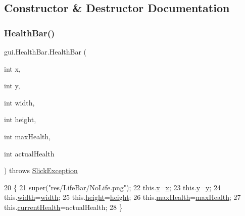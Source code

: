 \subsection{Constructor \& Destructor Documentation}
\mbox{\label{classgui_1_1_health_bar_a5f226ed0f456c4278c6c8eb0c927acc8}} 
\subsubsection{\texorpdfstring{Health\+Bar()}{HealthBar()}}
{\footnotesize\ttfamily gui.\+Health\+Bar.\+Health\+Bar (\begin{DoxyParamCaption}\item[{int}]{x,  }\item[{int}]{y,  }\item[{int}]{width,  }\item[{int}]{height,  }\item[{int}]{max\+Health,  }\item[{int}]{actual\+Health }\end{DoxyParamCaption}) throws \mbox{\hyperlink{classorg_1_1newdawn_1_1slick_1_1_slick_exception}{Slick\+Exception}}\hspace{0.3cm}{\ttfamily [inline]}}


\begin{DoxyCode}
20                                                                                                            
           \{
21         super(\textcolor{stringliteral}{"res/LifeBar/NoLife.png"});
22         this.\mbox{\hyperlink{classgui_1_1_health_bar_a8895162adfc4ba2fc6d4b324b8460d20}{x}}=\mbox{\hyperlink{classgui_1_1_health_bar_a8895162adfc4ba2fc6d4b324b8460d20}{x}};
23         this.\mbox{\hyperlink{classgui_1_1_health_bar_a330c927f65420a456814ef5bb30b5c9f}{y}}=\mbox{\hyperlink{classgui_1_1_health_bar_a330c927f65420a456814ef5bb30b5c9f}{y}};
24         this.\mbox{\hyperlink{classgui_1_1_health_bar_aefb7e95b9777d9bd70b457a0355ddeb7}{width}}=\mbox{\hyperlink{classgui_1_1_health_bar_aefb7e95b9777d9bd70b457a0355ddeb7}{width}};
25         this.\mbox{\hyperlink{classgui_1_1_health_bar_a5afdc634dd91432fb9829d3441d1a4aa}{height}}=\mbox{\hyperlink{classgui_1_1_health_bar_a5afdc634dd91432fb9829d3441d1a4aa}{height}};
26         this.\mbox{\hyperlink{classgui_1_1_health_bar_a140d4fec43b960a1ba75f3e767501e6f}{maxHealth}}=\mbox{\hyperlink{classgui_1_1_health_bar_a140d4fec43b960a1ba75f3e767501e6f}{maxHealth}};
27         this.\mbox{\hyperlink{classgui_1_1_health_bar_a598c9b29bf24fe830bff5d1ea2707b02}{currentHealth}}=actualHealth;
28     \}
\end{DoxyCode}


